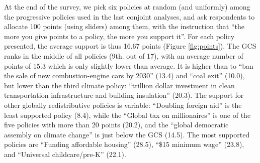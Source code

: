 At the end of the survey, we pick six policies at random (and uniformly) among the progressive policies used in the last conjoint analyses, and ask respondents to allocate 100 points (using sliders) among them, with the instruction that ``the more you give points to a policy, the more you support it''. For each policy presented, the average support is thus 16.67 points (Figure \ref{fig:points}). The GCS ranks in the middle of all policies (9th. out of 17), with an average number of points of 15.3 which is only slightly lower than average. It is higher than to ``ban the sale of new combustion-engine cars by 2030'' (13.4) and ``coal exit'' (10.0), but lower than the third climate policy: ``trillion dollar investment in clean transportation infrastructure and building insulation'' (20.3). The support for other globally redistributive policies is variable: ``Doubling foreign aid'' is the least supported policy (8.4), while the ``Global tax on millionaires'' is one of the five policies with more than 20 points (20.2), and the ``global democratic assembly on climate change'' is just below the GCS (14.5). The most supported policies are ``Funding affordable housing'' (28.5), ``\$15 minimum wage'' (23.8), and ``Universal childcare/pre-K'' (22.1). %

